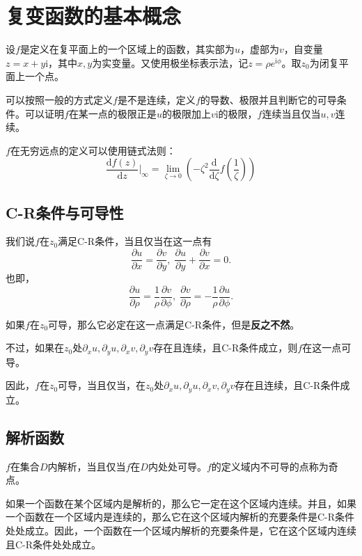\section{复变函数的基本概念}

设$f$是定义在复平面上的一个区域上的函数，其实部为$u$，虚部为$v$，自变量$z = x + y \mathrm{i}$，其中$x,y$为实变量。又使用极坐标表示法，记$z = \rho e^{\mathrm{i}\phi}$。取$z_0$为闭复平面上一个点。

可以按照一般的方式定义$f$是不是连续，定义$f$的导数、极限并且判断它的可导条件。可以证明$f$在某一点的极限正是$u$的极限加上$v\mathrm{i}$的极限，$f$连续当且仅当$u,v$连续。

$f$在无穷远点的定义可以使用链式法则： \[
\frac{\mathrm{d} f(z)}{\mathrm{d} z} \bigg |_{\infty} = \lim_{\zeta \rightarrow 0} \left( - \zeta^2 \frac{\mathrm{d}}{\mathrm{d} \zeta} f \left( \frac{1}{\zeta} \right) \right)
\]

\hypertarget{c-rux6761ux4ef6ux4e0eux53efux5bfcux6027}{%
\subsection{C-R条件与可导性}\label{c-rux6761ux4ef6ux4e0eux53efux5bfcux6027}}

我们说$f$在$z_0$满足C-R条件，当且仅当在这一点有 \[
\frac{\partial u}{\partial x} = \frac{\partial v}{\partial y}, \; \frac{\partial u}{\partial y} + \frac{\partial v}{\partial x} = 0.
\] 也即， \[
\frac{\partial u}{\partial \rho} = \frac{1}{\rho} \frac{\partial v}{\partial \phi}, \; \frac{\partial v}{\partial \rho} = - \frac{1}{\rho} \frac{\partial u}{\partial \phi}.
\]

如果$f$在$z_0$可导，那么它必定在这一点满足C-R条件，但是\textbf{反之不然}。

不过，如果在$z_0$处$\partial_x u, \partial_y u, \partial_x v, \partial_y v$存在且连续，且C-R条件成立，则$f$在这一点可导。

因此，$f$在$z_0$可导，当且仅当，在$z_0$处$\partial_x u, \partial_y u, \partial_x v, \partial_y v$存在且连续，且C-R条件成立。

\hypertarget{ux89e3ux6790ux51fdux6570}{%
\subsection{解析函数}\label{ux89e3ux6790ux51fdux6570}}

$f$在集合$D$内解析，当且仅当$f$在$D$内处处可导。$f$的定义域内不可导的点称为奇点。

如果一个函数在某个区域内是解析的，那么它一定在这个区域内连续。并且，如果一个函数在一个区域内是连续的，那么它在这个区域内解析的充要条件是C-R条件处处成立。因此，一个函数在一个区域内解析的充要条件是，它在这个区域内连续且C-R条件处处成立。

